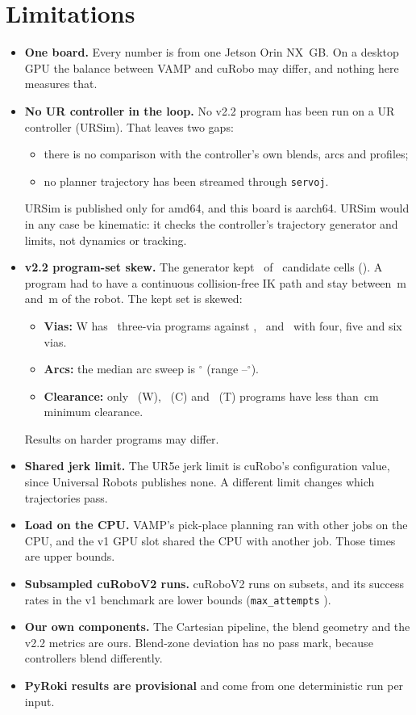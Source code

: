 \documentclass[11pt]{article}
\begin{document}
\section{Limitations}
\begin{itemize}
  \item \textbf{One board.} Every number is from one Jetson Orin NX \boardMem\,GB. On a desktop GPU the balance between VAMP and cuRobo may differ, and nothing here measures that.
  \item \textbf{No UR controller in the loop.} No v2.2 program has been run on a UR controller (URSim). That leaves two gaps:
  \begin{itemize}
    \item there is no comparison with the controller's own blends, arcs and profiles;
    \item no planner trajectory has been streamed through \texttt{servoj}.
  \end{itemize}
  URSim is published only for amd64, and this board is aarch64. URSim would in any case be kinematic: it checks the controller's trajectory generator and limits, not dynamics or tracking.
  \item \textbf{v2.2 program-set skew.} The generator kept \ttCells\ of \ttCandidates\ candidate cells (\ttAccept). A program had to have a continuous collision-free IK path and stay between \ttInner\,m and \ttOuter\,m of the robot. The kept set is skewed:
  \begin{itemize}
    \item \textbf{Vias:} W has \ttViasThree\ three-via programs against \ttViasFour, \ttViasFive\ and \ttViasSix\ with four, five and six vias.
    \item \textbf{Arcs:} the median arc sweep is \ttSweepMed$^\circ$ (range \ttSweepMin--\ttSweepMax$^\circ$).
    \item \textbf{Clearance:} only \ttClearW\ (W), \ttClearC\ (C) and \ttClearT\ (T) programs have less than \ttBlendR\,cm minimum clearance.
  \end{itemize}
  Results on harder programs may differ.
  \item \textbf{Shared jerk limit.} The UR5e jerk limit is cuRobo's configuration value, since Universal Robots publishes none. A different limit changes which trajectories pass.
  \item \textbf{Load on the CPU.} VAMP's pick-place planning ran with other jobs on the CPU, and the v1 GPU slot shared the CPU with another job. Those times are upper bounds.
  \item \textbf{Subsampled cuRoboV2 runs.} cuRoboV2 runs on subsets, and its success rates in the v1 benchmark are lower bounds (\texttt{max\_attempts} \vOneAttempts).
  \item \textbf{Our own components.} The Cartesian pipeline, the blend geometry and the v2.2 metrics are ours. Blend-zone deviation has no pass mark, because controllers blend differently.
  \item \textbf{PyRoki results are provisional} and come from one deterministic run per input.
\end{itemize}
\end{document}
